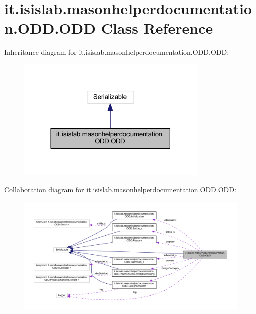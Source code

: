 \hypertarget{classit_1_1isislab_1_1masonhelperdocumentation_1_1_o_d_d_1_1_o_d_d}{\section{it.\-isislab.\-masonhelperdocumentation.\-O\-D\-D.\-O\-D\-D Class Reference}
\label{classit_1_1isislab_1_1masonhelperdocumentation_1_1_o_d_d_1_1_o_d_d}
}


Inheritance diagram for it.\-isislab.\-masonhelperdocumentation.\-O\-D\-D.\-O\-D\-D\-:
\nopagebreak
\begin{figure}[H]
\begin{center}
\leavevmode
\includegraphics[width=258pt]{classit_1_1isislab_1_1masonhelperdocumentation_1_1_o_d_d_1_1_o_d_d__inherit__graph}
\end{center}
\end{figure}


Collaboration diagram for it.\-isislab.\-masonhelperdocumentation.\-O\-D\-D.\-O\-D\-D\-:
\nopagebreak
\begin{figure}[H]
\begin{center}
\leavevmode
\includegraphics[width=350pt]{classit_1_1isislab_1_1masonhelperdocumentation_1_1_o_d_d_1_1_o_d_d__coll__graph}
\end{center}
\end{figure}
